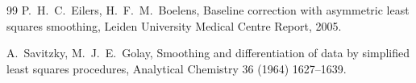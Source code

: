 \documentclass[preprint,12pt]{elsarticle}
\begin{document}
\begin{thebibliography}{99}
P.~H.~C.~Eilers, H.~F.~M.~Boelens, Baseline correction with asymmetric least
squares smoothing, Leiden University Medical Centre Report, 2005.

A.~Savitzky, M.~J.~E.~Golay, Smoothing and differentiation of data by simplified
least squares procedures, Analytical Chemistry 36 (1964) 1627--1639.


\end{thebibliography}
\end{document}
